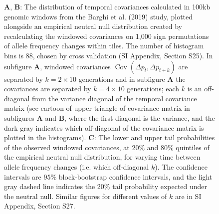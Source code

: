 \documentclass[9pt,twocolumn,twoside]{pnas-new}
\DeclareMathOperator{\cov}{Cov}
\begin{document}
\begin{figure}
  \caption{\footnotesize {\bf A}, {\bf B}: The distribution of temporal
    covariances calculated in 100kb genomic windows from the
    Barghi et al. (2019) study, plotted alongside an empirical neutral null
    distribution created by recalculating the windowed covariances on 1,000
    sign permutations of allele frequency changes within tiles. The number of histogram
    bins is 88, chosen by cross validation (SI Appendix, Section
    S25). In subfigure {\bf A},
    windowed covariances $\cov(\Delta p_t, \Delta p_{t+k})$ are separated by
    $k=2 \times 10$ generations and in subfigure {\bf A} the covariances are
    separated by $k=4 \times 10$ generations; each $k$ is an off-diagonal from
    the variance diagonal of the temporal covariance matrix (see cartoon of
    upper-triangle of covariance matrix in subfigures {\bf A} and {\bf B},
    where the first diagonal is the variance, and the dark gray indicates which
    off-diagonal of the covariance matrix is plotted in the histograms). {\bf
    C}: The lower and upper tail probabilities of the observed windowed
    covariances, at 20\% and 80\% quintiles of the empirical neutral null
    distribution, for varying time between allele frequency changes (i.e. which
    off-diagonal $k$). The confidence intervals are  $95\%$ block-bootstrap
  confidence intervals, and the light gray dashed line indicates the 20\% tail
probability expected under the neutral null. Similar figures for different
values of $k$ are in SI Appendix, Section S27.}

    \label{fig:figure-3} 
\end{figure}
\end{document}
